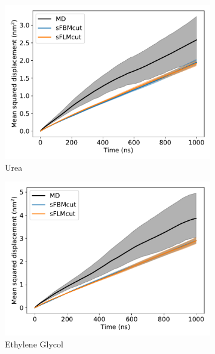 \documentclass[12pt]{article}
\begin{document}
  \begin{figure}
  \centering
  \begin{subfigure}{0.45\textwidth}
  \includegraphics[width=\textwidth]{2mode_msd_comparison_URE.pdf}
  \caption{Urea}\label{fig:2mode_msd_comparison_URE}
  \end{subfigure}
  \begin{subfigure}{0.45\textwidth}
  \includegraphics[width=\textwidth]{2mode_msd_comparison_GCL.pdf}
  \caption{Ethylene Glycol}\label{fig:2mode_msd_comparison_GCL}
  \end{subfigure}
  \begin{subfigure}{0.45\textwidth}

\end{subfigure}
\end{figure}
\end{document}
